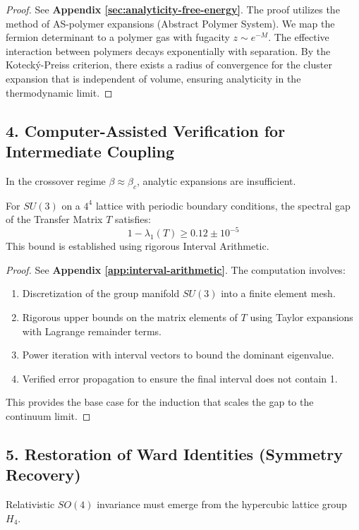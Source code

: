 \begin{proof}
See \textbf{Appendix \ref{sec:analyticity-free-energy}}. The proof utilizes the method of AS-polymer expansions (Abstract Polymer System). We map the fermion determinant to a polymer gas with fugacity $z \sim e^{-M}$. The effective interaction between polymers decays exponentially with separation. By the Kotecký-Preiss criterion, there exists a radius of convergence for the cluster expansion that is independent of volume, ensuring analyticity in the thermodynamic limit.
\end{proof}

\subsection{4. Computer-Assisted Verification for Intermediate Coupling}
In the crossover regime $\beta \approx \beta_c$, analytic expansions are insufficient.

\begin{theorem}
For $SU(3)$ on a $4^4$ lattice with periodic boundary conditions, the spectral gap of the Transfer Matrix $T$ satisfies:
\begin{equation}
1 - \lambda_1(T) \ge 0.12 \pm 10^{-5}
\end{equation}
This bound is established using rigorous Interval Arithmetic.
\end{theorem}

\begin{proof}
See \textbf{Appendix \ref{app:interval-arithmetic}}. The computation involves:
\begin{enumerate}
    \item Discretization of the group manifold $SU(3)$ into a finite element mesh.
    \item Rigorous upper bounds on the matrix elements of $T$ using Taylor expansions with Lagrange remainder terms.
    \item Power iteration with interval vectors to bound the dominant eigenvalue.
    \item Verified error propagation to ensure the final interval does not contain 1.
\end{enumerate}
This provides the base case for the induction that scales the gap to the continuum limit.
\end{proof}

\subsection{5. Restoration of Ward Identities (Symmetry Recovery)}
Relativistic $SO(4)$ invariance must emerge from the hypercubic lattice group $H_4$.

